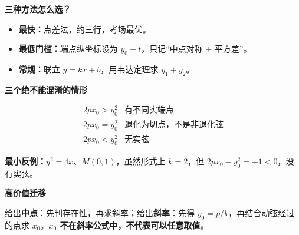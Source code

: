 \begin{summarybox}
\par\medskip
\begin{minipage}{\linewidth}
\noindent
\textbf{\textcolor{CSummary}{三种方法怎么选？}}\par\nobreak\smallskip
\begin{itemize}[leftmargin=*,itemsep=0.2em]
 \item \textbf{最快：}点差法，约三行，考场最优。
 \item \textbf{最低门槛：}端点纵坐标设为 $y_0\pm t$，只记“中点对称 + 平方差”。
 \item \textbf{常规：}联立 $y=kx+b$，用韦达定理求 $y_1+y_2$。
\end{itemize}\par
\end{minipage}
\par

\par\medskip
\begin{minipage}{\linewidth}
\noindent
\textbf{\textcolor{CSummary}{三个绝不能混淆的情形}}\par\nobreak\smallskip
\[
\begin{array}{c|c}
 2px_0>y_0^2 & \text{有不同实端点}\\
 2px_0=y_0^2 & \text{退化为切点，不是非退化弦}\\
 2px_0<y_0^2 & \text{无实弦}
\end{array}
\]\par
\end{minipage}
\par

\par\noindent\textbf{最小反例：}$y^2=4x$、$M(0,1)$，虽然形式上 $k=2$，但 $2px_0-y_0^2=-1<0$，没有实弦。
\par\medskip
\begin{minipage}{\linewidth}
\noindent
\textbf{\textcolor{CSummary}{高价值迁移}}\par\nobreak\smallskip
给出\textbf{中点}：先判存在性，再求斜率；给出\textbf{斜率}：先得 $y_0=p/k$，再结合动弦经过的点求 $x_0$。\textbf{$x_0$ 不在斜率公式中，不代表可以任意取值。}\par
\end{minipage}
\par

\end{summarybox}
